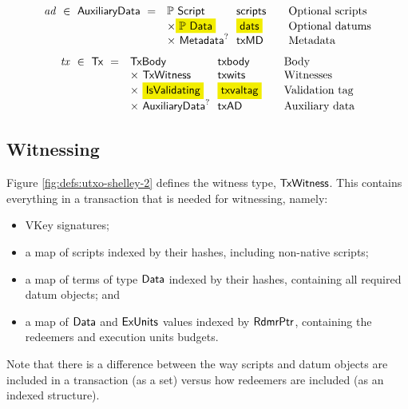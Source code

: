 \begin{figure*}[htb]
\begin{equation*}
  \end{equation*}
  \begin{equation*}
    \begin{array}{r@{~~}l@{~~}l@{\qquad}l}
      \var{ad} ~\in~ \AuxiliaryData ~=~
      & \powerset{\Script} & \fun{scripts}& \text{Optional scripts}\\
      & \times \hldiff{\powerset{\Data}} & \hldiff{\fun{dats}}& \text{Optional datums}\\
      & \times ~\Metadata^? & \fun{txMD}&\text{Metadata}
    \end{array}
  \end{equation*}
  \begin{equation*}
    \begin{array}{r@{~~}l@{~~}l@{\qquad}l}
      \var{tx} ~\in~ \Tx ~=~
      & \TxBody & \fun{txbody} & \text{Body}\\
      & \times ~\TxWitness & \fun{txwits} & \text{Witnesses}\\
      & \times ~\hldiff{\IsValidating} & \hldiff{\fun{txvaltag}}&\text{Validation tag}\\
      & \times ~\AuxiliaryData^? & \fun{txAD}&\text{Auxiliary data}\\
    \end{array}
  \end{equation*}
  \caption{Definitions for transactions, cont.}
  \label{fig:defs:utxo-shelley-2}
\end{figure*}

\subsection{Witnessing}
Figure \ref{fig:defs:utxo-shelley-2} defines the witness type, $\mathsf{TxWitness}$.  This contains everything
in a transaction that is needed for witnessing, namely:

\begin{itemize}
  \item VKey signatures;
  \item a map of scripts indexed by their hashes, including non-native scripts;
  \item a map of terms of type $\mathsf{Data}$ indexed by their hashes, containing all required datum objects; and
  \item a map of $\mathsf{Data}$ and $\mathsf{ExUnits}$ values indexed by $\mathsf{RdmrPtr}$, containing the redeemers and execution units budgets.
\end{itemize}

Note that there is a difference between the way scripts and datum objects are included in
a transaction (as a set) versus how redeemers are included
(as an indexed structure).

